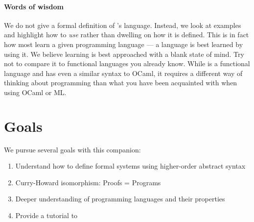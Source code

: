 \paragraph{Words of wisdom}
We do not give a formal definition of \beluga's language.  Instead,  we look at examples and highlight how to \emph{use} \beluga rather than dwelling on how it is defined. This is in fact how most learn a given programming language --- a language is best learned by using it. We believe learning \beluga is best approached with a blank state of mind. Try not to compare it to functional languages you already know. While \beluga is a functional language and has even a similar syntax to OCaml,  it requires a different way of thinking about programming than what you have been acquainted with when using OCaml or ML.



\section{Goals}
We pursue several goals with this companion:

\begin{enumerate}
\item Understand how to define formal systems using higher-order abstract syntax
\item Curry-Howard isomorphism: Proofs = Programs
\item Deeper understanding of programming languages and their properties
\item Provide a tutorial to \beluga
\end{enumerate}




